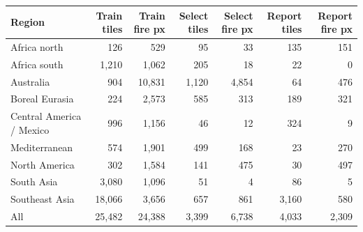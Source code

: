 \begin{tabular}{lrrrrrr}
\toprule
Region & Train tiles & Train fire px & Select tiles & Select fire px & Report tiles & Report fire px \\
\midrule
Africa north & 126 & 529 & 95 & 33 & 135 & 151 \\
Africa south & 1,210 & 1,062 & 205 & 18 & 22 & 0 \\
Australia & 904 & 10,831 & 1,120 & 4,854 & 64 & 476 \\
Boreal Eurasia & 224 & 2,573 & 585 & 313 & 189 & 321 \\
Central America / Mexico & 996 & 1,156 & 46 & 12 & 324 & 9 \\
Mediterranean & 574 & 1,901 & 499 & 168 & 23 & 270 \\
North America & 302 & 1,584 & 141 & 475 & 30 & 497 \\
South Asia & 3,080 & 1,096 & 51 & 4 & 86 & 5 \\
Southeast Asia & 18,066 & 3,656 & 657 & 861 & 3,160 & 580 \\
\midrule
All & 25,482 & 24,388 & 3,399 & 6,738 & 4,033 & 2,309 \\
\bottomrule
\end{tabular}
